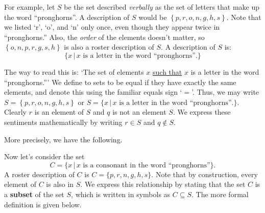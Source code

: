 For example, let $S$ be the set described \textit{verbally} as the set of letters that make up the word ``pronghorns''.  A   description of $S$ would be  $\left\{ p, r, o, n, g, h, s \right\}$. Note that we listed `r', `o', and `n' only once, even though they appear twice in ``pronghorns.''  Also, the \textit{order} of the elements doesn't matter, so $\left\{ o, n, p, r, g, s, h \right\}$ is also a roster description of $S$.   A  description of $S$ is: \[ \{ x \, | \, \mbox{$x$ is a
letter in the word ``pronghorns''.}\} \]

The way to read this is: `The set of elements $x$ \underline{such that} $x$ is a letter in the word ``pronghorns.'''   We define to sets to be equal if they have exactly the same elements, and denote this using the familiar equals sign `$=$'. Thus, we may write
$S = \left\{  p, r, o, n, g, h, s  \right\}$ or  $S = \{ x \, | \, \mbox{$x$ is a
letter in the word ``pronghorns''.}\}$.
Clearly $r$ is an element of $S$ and $q$ is not an element $S$.  We express these sentiments mathematically by writing  $r \in S$ and $q \notin S$. 

More precisely, we have the following.

\medskip



\medskip

Now let's consider the set 
\[
C =  \{ x \, | \, \mbox{$x$ is a consonant in the word ``pronghorns''}\}.
\]
A roster description of $C$ is  $C = \{ p, r, n, g, h, s\}$.  Note that by construction, every element of $C$ is also in $S$.  We express this relationship by stating that the set $C$ is a \textbf{subset} of the set $S$, which is written in symbols as $C \subseteq S$.  The more formal definition is given below.

